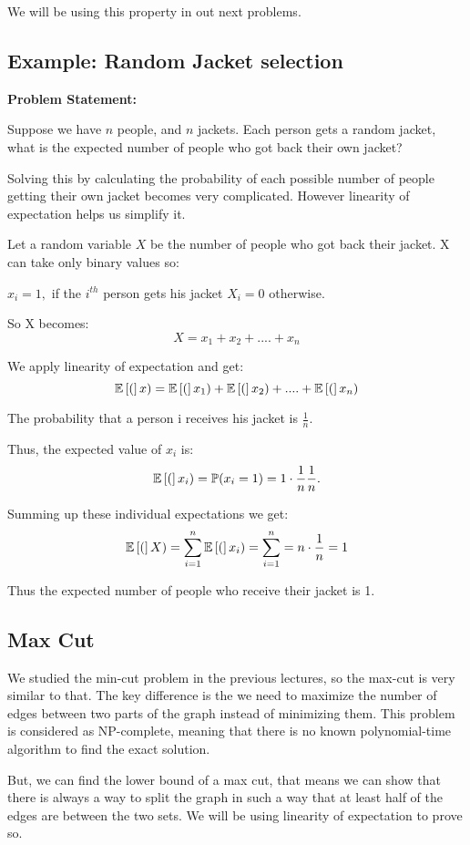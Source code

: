 We will be using this property in out next problems.



\subsection*{Example: Random Jacket selection}
\textbf{Problem Statement:}

Suppose we have \(n\) people, and \(n\) jackets. Each person gets a random jacket, what is the expected number of people who got back their own jacket?

Solving this by calculating the probability of each possible number of people getting their own jacket becomes very complicated. However linearity of expectation helps us simplify it.

Let a random variable \(X\) be the number of people who got back their jacket. X can take only binary values so:

\(x_i = 1, \) if the \(i^{th}\) person gets his jacket
\(X_i = 0\) otherwise.

So X becomes:
\[
X = x_1 + x_2 + .... + x_n
\]

We apply linearity of expectation and get:
\[
\operatorname{\mathbb{E}}\left[(\right]x) = \operatorname{\mathbb{E}}\left[(\right]x_1) + \operatorname{\mathbb{E}}\left[(\right]x_2) + .... + \operatorname{\mathbb{E}}\left[(\right]x_n)
\]

The probability that a person i receives his jacket is \(\frac{1}{n}\).

Thus, the expected value of \(x_i\) is:
\[
\operatorname{\mathbb{E}}\left[(\right]x_i) = \mathbb{P}(x_i = 1) = 1 \cdot \frac{1}{n} \frac{1}{n}.
\]

Summing up these individual expectations we get:
\[
\operatorname{\mathbb{E}}\left[(\right]X) = \sum_{i=1}^n \operatorname{\mathbb{E}}\left[(\right]x_i) =\sum_{i=1}^n = n \cdot \frac{1}{n} = 1
\]

Thus the expected number of people who receive their jacket is 1.

\subsection*{Max Cut}
We studied the min-cut problem in the previous lectures, so the max-cut is very similar to that. The key difference is the we need to maximize the number of edges between two parts of the graph instead of minimizing them. This problem is considered as NP-complete, meaning that there is no known polynomial-time algorithm to find the exact solution. 

But, we can find the lower bound of a max cut, that means we can show that there is always a way to split the graph in such a way that at least half of the edges are between the two sets. We will be using linearity of expectation to prove so.

